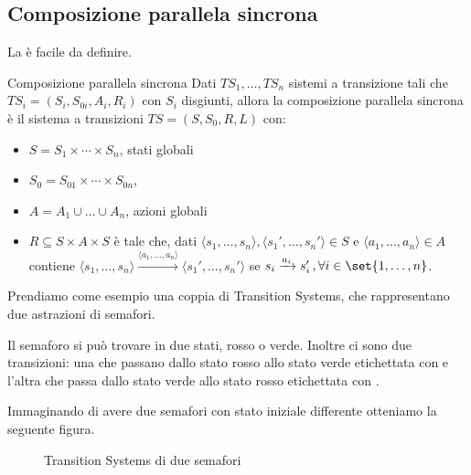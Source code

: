 \subsection{Composizione parallela sincrona}
La  è facile da definire.

\begin{definition}{Composizione parallela sincrona}
  Dati \(TS_1, \ldots, TS_n\) sistemi a transizione tali che \(TS_i = (S_i, S_{0i}, A_i, R_i)\) con \(S_i\) disgiunti, allora la composizione parallela sincrona è il sistema a transizioni \(TS = (S,S_0,R,L)\) con:
  \begin{itemize}
    \item \(S = S_1 \times \cdots \times S_n\), stati globali
    \item \(S_0 = S_{01} \times \cdots \times S_{0n}\),
    \item \(A = A_1 \cup \ldots \cup A_n\), azioni globali
    \item \(R \subseteq S \times A \times S\) è tale che, dati \(\langle s_1, \ldots, s_n\rangle, \langle s_1', \ldots, s_n'\rangle \in S\) e \(\langle a_1,\ldots, a_n \rangle \in A\) contiene \(\langle s_1,\ldots,s_n \rangle \xrightarrow{\langle a_1,\ldots,a_n \rangle} \langle s_1',\ldots,s_n'\rangle\) se \(s_i \xrightarrow{a_i} s_i'\,, \forall i \in \set{1,\ldots,n}\).
  \end{itemize}
\end{definition}

Prendiamo come esempio una coppia di Transition Systems, che rappresentano due astrazioni di semafori.

Il semaforo si può trovare in due stati, rosso o verde. Inoltre ci sono due transizioni: una che passano dallo stato rosso allo stato verde etichettata con  e l'altra che passa dallo stato verde allo stato rosso etichettata con .

Immaginando di avere due semafori con stato iniziale differente otteniamo la seguente figura.

\begin{figure}[H]
  \centering
  \caption{Transition Systems di due semafori}\label{fig:ts_semaphore}
\end{figure}

